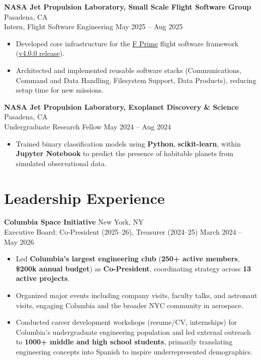 \documentclass[a4paper,12pt]{article}
\newenvironment{joblong}[4]
    {
    \noindent\textbf{#1} \dotfill #2 \\
    \noindent #3 \dotfill #4 \\[3.75pt]
    \begin{minipage}[t]{\linewidth}
    \begin{itemize}[nosep,after=\strut, leftmargin=1em, itemsep=3pt,label=--]
    }
    {
    \end{itemize}
    \end{minipage}    
    }
\begin{document}
\begin{joblong}{NASA Jet Propulsion Laboratory, Small Scale Flight Software Group}{Pasadena, CA}{Intern, Flight Software Engineering}{May 2025 -- Aug 2025}
\item Developed core infrastructure for the \href{https://fprime.jpl.nasa.gov/}{F Prime} flight software framework (\href{https://github.com/nasa/fprime/releases/tag/v4.0.0}{v4.0.0 release}).
\item Architected and implemented reusable software stacks (Communications, Command and Data Handling, Filesystem Support, Data Products), reducing setup time for new missions.
\end{joblong}

\begin{joblong}{NASA Jet Propulsion Laboratory, Exoplanet Discovery \& Science}{Pasadena, CA}{Undergraduate Research Fellow}{May 2024 -- Aug 2024}
\item Trained binary classification models using \textbf{Python}, \textbf{scikit-learn}, within \textbf{Jupyter Notebook} to predict the presence of habitable planets from simulated observational data.
\end{joblong}

\section{Leadership Experience}

\begin{joblong}{Columbia Space Initiative}{New York, NY}{Executive Board: Co-President (2025--26), Treasurer (2024--25)}{March 2024 -- May 2026}
\item Led \textbf{Columbia's largest engineering club} (\textbf{250+ active members}, \textbf{\$200k annual budget}) as \textbf{Co-President}, coordinating strategy across \textbf{13 active projects}.
\item Organized major events including company visits, faculty talks, and astronaut visits, engaging Columbia and the broader NYC community in aerospace.
\item Conducted career development workshops (resume/CV, internships) for Columbia's undergraduate engineering population and led external outreach to \textbf{1000+ middle and high school students}, primarily translating engineering concepts into Spanish to inspire underrepresented demographics.
\end{joblong}
\end{document}
